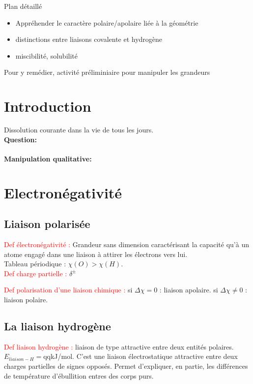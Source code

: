 \begin{reportBlock}{Plan détaillé}
\begin{itemize}
\item Appréhender le caractère polaire/apolaire liée à la géométrie
\item distinctions entre liaisons covalente et hydrogène
\item miscibilité, solubilité
\end{itemize}
Pour y remédier, activité préliminiaire pour manipuler les grandeurs
\section*{Introduction }
Dissolution courante dans la vie de tous les jours.\\
\textbf{Question:}

\paragraph*{Manipulation qualitative:} \textcolor{green}{}

\section{Electronégativité}

\subsection{Liaison polarisée}

\textcolor{red}{Def électronégativité : }Grandeur sans dimension caractérisant la capacité qu'à un atome engagé dans une liaison à attirer les électrons vers lui.\\
Tableau périodique : $\chi(O)>\chi(H)$.\\

\textcolor{red}{Def charge partielle : }$\delta^{\pm}$

\textcolor{red}{Def polarisation d'une liaison chimique : }si $\Delta\chi=0$ : liaison apolaire. si $\Delta\chi\neq 0$ : liaison polaire.

\subsection{La liaison hydrogène}
\textcolor{red}{Def liaison hydrogène : }liaison de type attractive entre deux entités polaires. $E_{liaison-H}=$qqkJ/mol. C'est une liaison électrostatique attractive entre deux charges partielles de signes opposés. Permet d'expliquer, en partie, les différences de température d'ébullition entres des corps purs.



\end{reportBlock}
